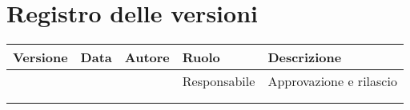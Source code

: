 \section*{Registro delle versioni}

\begin{tabular}{|C{1.7cm}|C{2cm}|C{3.5cm}|C{2.5cm}|L{4cm}|}
    \hline
    \textbf{Versione} & \textbf{Data} & \textbf{Autore} & \textbf{Ruolo} & \textbf{Descrizione} \\
        \hline
        &  &  & Responsabile & Approvazione e rilascio \\
        \hline
        &  &  &  &  \\
        \hline
        &  &  &  &  \\
        \hline
\end{tabular}